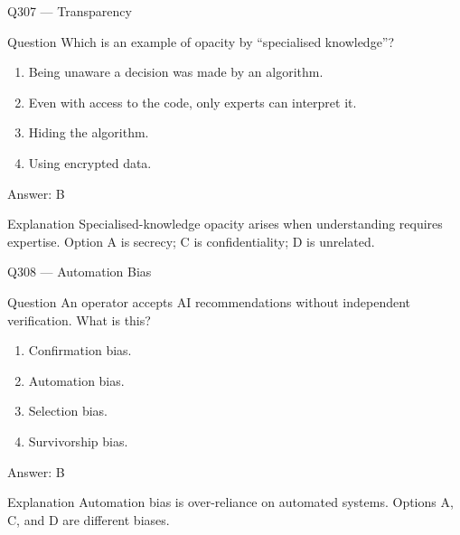 \documentclass[aspectratio=169,8pt]{beamer}
\begin{document}
\begin{frame}{Q307 --- Transparency}
	\begin{block}{Question}
		Which is an example of opacity by ``specialised knowledge''?
		\begin{enumerate}
			\item Being unaware a decision was made by an algorithm.
			\item Even with access to the code, only experts can interpret it.
			\item Hiding the algorithm.
			\item Using encrypted data.
	\end{enumerate}  \end{block}
	\begin{exampleblock}{Answer: B}\end{exampleblock}
	\begin{block}{Explanation}
		Specialised-knowledge opacity arises when understanding requires expertise. Option A is secrecy; C is confidentiality; D is unrelated.
	\end{block}
\end{frame}

\begin{frame}{Q308 --- Automation Bias}
	\begin{block}{Question}
		An operator accepts AI recommendations without independent verification. What is this?
		\begin{enumerate}
			\item Confirmation bias.
			\item Automation bias.
			\item Selection bias.
			\item Survivorship bias.
	\end{enumerate}  \end{block}
	\begin{exampleblock}{Answer: B}\end{exampleblock}
	\begin{block}{Explanation}
		Automation bias is over-reliance on automated systems. Options A, C, and D are different biases.
	\end{block}
\end{frame}
\end{document}
